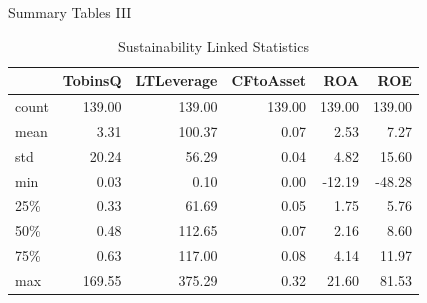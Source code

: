 \documentclass[
	8pt, %
]{beamer}
\begin{document}
\begin{frame}{Summary Tables III}
  \begin{table}[h]
\centering
\caption{Sustainability Linked Statistics}
\begin{tabular}{lrrrrr}
\hline
 & TobinsQ & LTLeverage & CFtoAsset & ROA & ROE \\
\hline
count & 139.00 & 139.00 & 139.00 & 139.00 & 139.00 \\
mean & 3.31 & 100.37 & 0.07 & 2.53 & 7.27 \\
std & 20.24 & 56.29 & 0.04 & 4.82 & 15.60 \\
min & 0.03 & 0.10 & 0.00 & -12.19 & -48.28 \\
25\% & 0.33 & 61.69 & 0.05 & 1.75 & 5.76 \\
50\% & 0.48 & 112.65 & 0.07 & 2.16 & 8.60 \\
75\% & 0.63 & 117.00 & 0.08 & 4.14 & 11.97 \\
max & 169.55 & 375.29 & 0.32 & 21.60 & 81.53 \\
\hline
\end{tabular}
\label{table:6}
\end{table}  
\end{frame}
\end{document}
